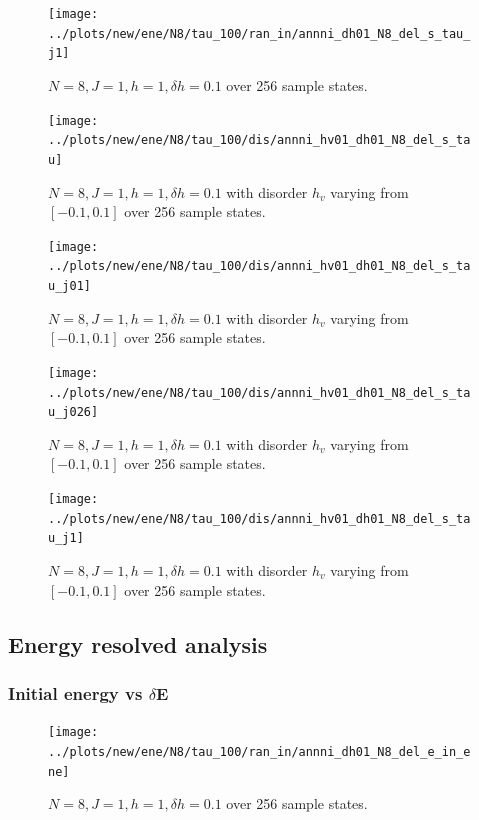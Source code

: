 \documentclass[a4paper]{article}
\begin{document}
\begin{figure}[h!]
  \centering
  \texttt{[image: ../plots/new/ene/N8/tau\_100/ran\_in/annni\_dh01\_N8\_del\_s\_tau\_j1]}
  \caption{$N = 8, J = 1, h = 1, \delta h=0.1$ over 256 sample states.}
  \label{fig:}
\end{figure}

\begin{figure}[h!]
  \centering
  \texttt{[image: ../plots/new/ene/N8/tau\_100/dis/annni\_hv01\_dh01\_N8\_del\_s\_tau]}
  \caption{$N = 8, J = 1, h = 1, \delta h=0.1$ with disorder $h_v$ varying from $[-0.1,0.1]$ over 256 sample states.}
  \label{fig:}
\end{figure}

\begin{figure}[h!]
  \centering
  \texttt{[image: ../plots/new/ene/N8/tau\_100/dis/annni\_hv01\_dh01\_N8\_del\_s\_tau\_j01]}
  \caption{$N = 8, J = 1, h = 1, \delta h=0.1$ with disorder $h_v$ varying from $[-0.1,0.1]$ over 256 sample states.}
  \label{fig:}
\end{figure}

\begin{figure}[h!]
  \centering
  \texttt{[image: ../plots/new/ene/N8/tau\_100/dis/annni\_hv01\_dh01\_N8\_del\_s\_tau\_j026]}
  \caption{$N = 8, J = 1, h = 1, \delta h=0.1$ with disorder $h_v$ varying from $[-0.1,0.1]$ over 256 sample states.}
  \label{fig:}
\end{figure}

\begin{figure}[h!]
  \centering
  \texttt{[image: ../plots/new/ene/N8/tau\_100/dis/annni\_hv01\_dh01\_N8\_del\_s\_tau\_j1]}
  \caption{$N = 8, J = 1, h = 1, \delta h=0.1$ with disorder $h_v$ varying from $[-0.1,0.1]$ over 256 sample states.}
  \label{fig:}
\end{figure}


\clearpage
\subsection{Energy resolved analysis}
\subsubsection{Initial energy vs $\delta$E}
\begin{figure}[h!]
  \centering
  \texttt{[image: ../plots/new/ene/N8/tau\_100/ran\_in/annni\_dh01\_N8\_del\_e\_in\_ene]}
  \caption{$N = 8, J = 1, h = 1, \delta h=0.1$ over 256 sample states.}
  \label{fig:}
\end{figure}
\end{document}
